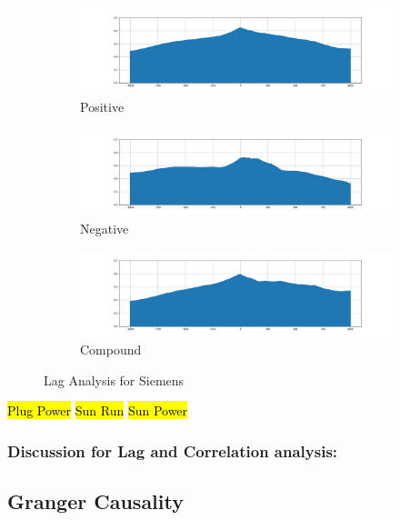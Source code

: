 \documentclass[sigconf, nonacm]{acmart}
\begin{document}
\begin{figure}
\begin{subfigure}{.2\textwidth}
  \centering
  \includegraphics[width=.8\linewidth]{images/fslr_1000_pos.png}
  \caption{Positive}
  \label{fig:sfig1}
\end{subfigure}%
\begin{subfigure}{.2\textwidth}
  \centering
  \includegraphics[width=.8\linewidth]{images/fslr_1000_neg.png}
  \caption{Negative}
  \label{fig:sfig2}
\end{subfigure}

\begin{subfigure}{.2\textwidth}
  \centering
  \includegraphics[width=.8\linewidth]{images/fslr_1000_comp.png}
  \caption{Compound}
  \label{fig:sfig2}
\end{subfigure}
\caption{Lag Analysis for Siemens}
\label{fig:fig}
\end{figure}



\hl{Plug Power}
\hl{Sun Run}
\hl{Sun Power}

\subsubsection{Discussion for Lag and Correlation analysis:}

\subsection{Granger Causality} 
\end{document}
